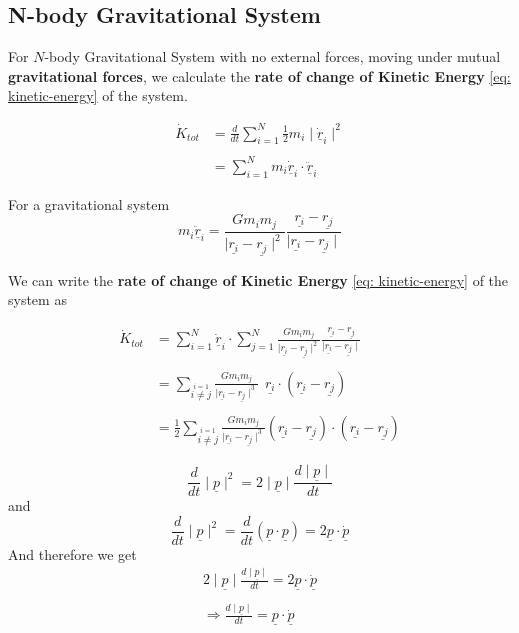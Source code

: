 \subsection{N-body Gravitational System}
For $N$-body Gravitational System with no external forces, moving under mutual {\bf gravitational forces}, we calculate the {\bf rate of change of Kinetic Energy} \eqref{eq: kinetic-energy} of the system.

\begin{align*}
	\dot{K}_{tot} & =\frac{d}{dt}\sum_{i=1}^{N}\frac{1}{2}m_i \mid \underline{\dot{r}}_i \mid^{2} \\ \\
	              & = \sum_{i=1}^{N}m_{i}\underline{\dot{r}}_i \cdot \underline{\ddot{r}}_i
\end{align*}

\begin{note}
	For a gravitational system
	$$m_i \underline{\ddot{r}}_i = \frac{Gm_{i}m_{j}}{\mid \underline{r_i} - \underline{r_j} \mid^{2}} \frac{\underline{r_i} - \underline{r_j}}{\mid \underline{r_i} - \underline{r_j} \mid }$$
\end{note}

We can write the {\bf rate of change of Kinetic Energy} \eqref{eq: kinetic-energy} of the system as

\begin{align*}
	\dot{K}_{tot} & = \sum_{i=1}^{N} \underline{\dot{r}}_i  \cdot \sum_{j=1}^{N} \frac{Gm_{i}m_{j}}{\mid \underline{r_i} - \underline{r_j} \mid^{2}} \frac{\underline{r_i} - \underline{r_j}}{\mid \underline{r_i} - \underline{r_j} \mid }       \\ \\
	              & = \sum_{\stackrel{i=1}{i \neq j}} \frac{Gm_{i}m_{j}}{\mid \underline{r_i} - \underline{r_j} \mid^{3}} \ \ \underline{r_i} \cdot (\underline{r_i} - \underline{r_j})                                                           \\ \\
	              & = \frac{1}{2}\sum_{\stackrel{i=1}{i \neq j}}\frac{Gm_{i}m_{j}}{\mid \underline{r_i} - \underline{r_j} \mid^{3}} (\underline{r_i} - \underline{r_j}) \cdot (\underline{r_i} - \underline{r_j}) \tag{$*$} \label{ct: n-gravity}
\end{align*}

\begin{remark}
	$$\frac{d}{dt}\mid \underline{p}\mid^{2} = 2 \mid \underline{p} \mid \frac{d \mid\underline{p} \mid }{dt}$$
	and
	$$\frac{d}{dt}\mid \underline{p}\mid^{2} = \frac{d}{dt}(\underline{p} \cdot \underline{p}) = 2\underline{{p}}\cdot\underline{\dot{p}}  $$
	And therefore we get
	\begin{align*}
		2\mid \underline{p} \mid \frac{d\mid \underline{p}\mid }{dt} = 2\underline{p}\cdot\underline{\dot{p}} \\ \\
		\Rightarrow \frac{d\mid \underline{p}\mid }{dt} =  \underline{p}\cdot\underline{\dot{p}}
	\end{align*}
\end{remark}


